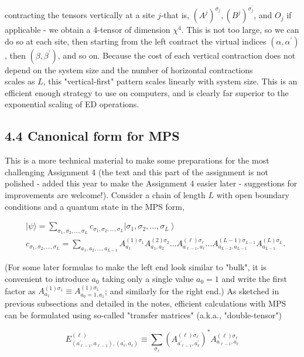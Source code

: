 \documentclass[12pt]{article}
\begin{document}
contracting the tensors vertically at a site $j$-that is, $\left(A^{j}\right)^{\sigma_{j}},\left(B^{j}\right)^{\sigma_{j}^{\prime}}$, and $O_{j}$ if applicable - we obtain a 4-tensor of dimension $\chi^{4}$. This is not too large, so we can do so at each site, then starting from the left contract the virtual indices $\left(\alpha, \alpha^{\prime}\right)$, then $\left(\beta, \beta^{\prime}\right)$, and so on. Because the cost of each vertical contraction does not depend on the system size and the number of horizontal contractions\\
scales as $L$, this "vertical-first" pattern scales linearly with system size. This is an efficient enough strategy to use on computers, and is clearly far superior to the exponential scaling of ED operations.

\subsection*{4.4 Canonical form for MPS}
This is a more technical material to make some preparations for the most challenging Assignment 4 (the text and this part of the assignment is not polished - added this year to make the Assignment 4 easier later - suggestions for improvements are welcome!). Consider a chain of length $L$ with open boundary conditions and a quantum state in the MPS form,


\begin{align*}
& |\psi\rangle=\sum_{\sigma_{1}, \sigma_{2}, \ldots, \sigma_{L}} c_{\sigma_{1}, \sigma_{2}, \ldots, \sigma_{L}}\left|\sigma_{1}, \sigma_{2}, \ldots, \sigma_{L}\right\rangle  \tag{18}\\
& c_{\sigma_{1}, \sigma_{2}, \ldots, \sigma_{L}}=\sum_{a_{1}, a_{2}, \ldots, a_{L-1}} A_{a_{1}}^{(1) \sigma_{1}} A_{a_{1}, a_{2}}^{(2) \sigma_{2}} \ldots A_{a_{\ell-1}, a_{\ell}}^{(\ell) \sigma_{\ell}} \ldots A_{a_{L-2}, a_{L-1}}^{(L-1) \sigma_{L-1}} A_{a_{L-1}}^{(L) \sigma_{L}} . \tag{19}
\end{align*}


(For some later formulas to make the left end look similar to "bulk", it is convenient to introduce $a_{0}$ taking only a single value $a_{0}=1$ and write the first factor as $A_{a_{1}}^{(1) \sigma_{1}} \equiv A_{a_{0}=1, a_{1}}^{(1) \sigma_{1}}$; and similarly for the right end.) As sketched in previous subsections and detailed in the notes, efficient calculations with MPS can be formulated using so-called "transfer matrices" (a.k.a., "double-tensor")


\begin{equation*}
E_{\left(a_{\ell-1}^{\prime}, a_{\ell-1}\right),\left(a_{\ell}^{\prime}, a_{\ell}\right)}^{(\ell)} \equiv \sum_{\sigma_{\ell}}\left(A_{a_{\ell-1}^{\prime}, a_{\ell}^{\prime}}^{(\ell) \sigma_{\ell}}\right)^{*} A_{a_{\ell-1}, a_{\ell}}^{(\ell) \sigma_{\ell}} \tag{20}
\end{equation*}
\end{document}
